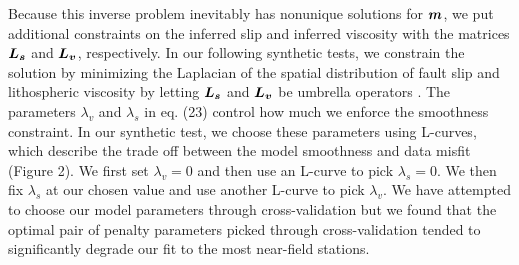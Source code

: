 \documentclass[extra,mreferee]{gji}
\begin{document}
Because this inverse problem inevitably has nonunique solutions for
$\mitbf{m}$, we put additional constraints on the inferred slip and
inferred viscosity with the matrices $\mitbf{L_s}$ and $\mitbf{L_v}$,
respectively.  In our following synthetic tests, we constrain the
solution by minimizing the Laplacian of the spatial distribution of
fault slip and lithospheric viscosity by letting
$\mitbf{L_s}$ and $\mitbf{L_v}$ be umbrella operators \citep{D1999}.
The parameters $\lambda_v$ and $\lambda_s$ in eq. (23) control how
much we enforce the smoothness constraint.  In our synthetic test, we
choose these parameters using L-curves, which describe the trade off
between the model smoothness and data misfit (Figure 2).  We first set
$\lambda_v=0$ and then use an L-curve to pick $\lambda_s=0$.  We then
fix $\lambda_s$ at our chosen value and use another L-curve to pick
$\lambda_v$.  We have attempted to choose our model parameters through
cross-validation but we found that the optimal pair of penalty
parameters picked through cross-validation tended to significantly
degrade our fit to the most near-field stations.
\end{document}
